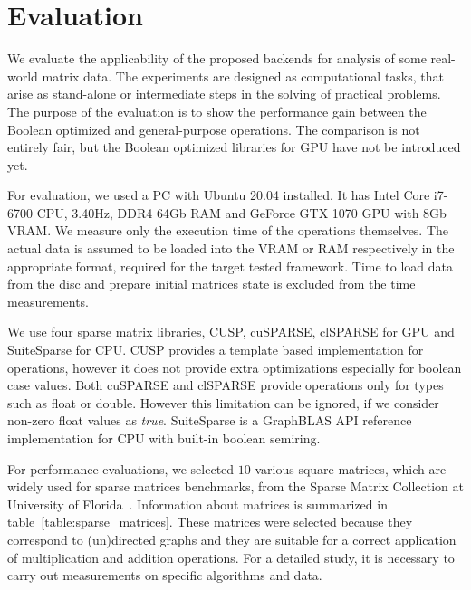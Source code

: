 \section{Evaluation}



We evaluate the applicability of the proposed backends for analysis of some real-world matrix data.
The experiments are designed as computational tasks, that arise as stand-alone or intermediate steps in the solving of practical problems. 
The purpose of the evaluation is to show the performance gain between the Boolean optimized and general-purpose operations. 
The comparison is not entirely fair, but the Boolean optimized libraries for GPU have not be introduced yet.


For evaluation, we used a PC with Ubuntu 20.04 installed.
It has Intel Core i7-6700 CPU, 3.40Hz, DDR4 64Gb RAM and GeForce GTX 1070 GPU with 8Gb VRAM.
We measure only the execution time of the operations themselves.
The actual data is assumed to be loaded into the VRAM or RAM respectively in the appropriate format, required for the target tested framework.
Time to load data from the disc and prepare initial matrices state is excluded from the time measurements.

We use four sparse matrix libraries, CUSP, cuSPARSE, clSPARSE for GPU and SuiteSparse for CPU.
CUSP provides a template based implementation for operations, however it does not provide extra optimizations especially for boolean case values. Both cuSPARSE and clSPARSE provide operations only for types such as float or double.
However this limitation can be ignored, if we consider non-zero float values as \textit{true}.
SuiteSparse is a GraphBLAS API reference implementation for CPU with built-in boolean semiring.

For performance evaluations, we selected $10$ various square matrices, which are widely used for sparse matrices benchmarks, from the Sparse Matrix Collection at University of Florida~\cite{data:suitesparse_matrix_collection}.
Information about matrices is summarized in table~\ref{table:sparse_matrices}.
These matrices were selected because they correspond to (un)directed graphs 
and they are suitable for a correct application of multiplication and addition operations. 
For a detailed study, it is necessary to carry out measurements on specific algorithms and data. 

